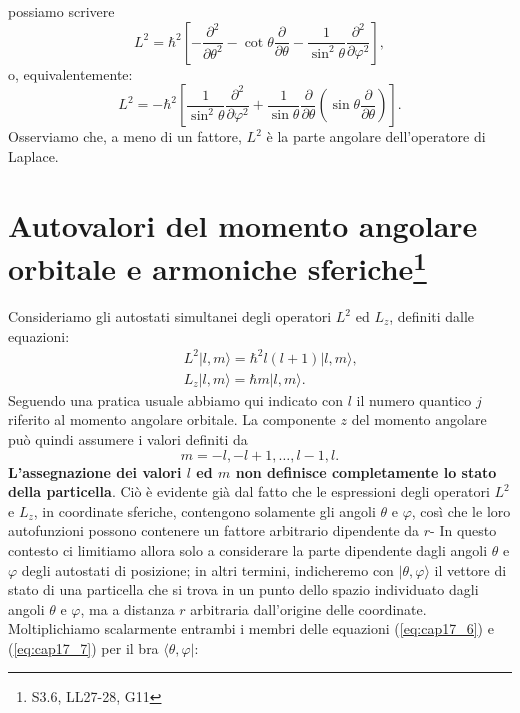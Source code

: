 possiamo scrivere
\begin{equation}
L^2 = \hbar ^2 \left[- \frac{\partial ^2}{\partial \theta ^2}-\cot \theta \frac{\partial}{\partial \theta}- \frac{1}{\sin ^2 \theta}\frac{\partial ^2}{\partial \varphi ^2}\right] ,
\end{equation}
o, equivalentemente:
\begin{equation}
L^2 = -\hbar ^2 \left[\frac{1}{\sin ^2 \theta}\frac{\partial ^2}{\partial \varphi ^2}+\frac{1}{\sin \theta}\frac{\partial}{\partial \theta} \left(\sin \theta \frac{\partial}{\partial \theta}\right)\right] .
\end{equation}
Osserviamo che, a meno di un fattore, $L^2$ è la parte angolare dell'operatore di Laplace.
\section[Autovalori del momento angolare orbitale e armoniche sferiche]{Autovalori del momento angolare orbitale e armoniche sferiche\footnote{S3.6, LL27-28, G11}}
Consideriamo gli autostati simultanei degli operatori $L^2$ ed $L_z$, definiti dalle equazioni:
\begin{eqnarray}
& &L^2 \vert l, m \rangle = \hbar ^2 l(l+1) \vert l, m \rangle ,\label{eq:cap17_6}\\
& &L_z \vert l, m \rangle = \hbar m \vert l, m \rangle \label{eq:cap17_7}.
\end{eqnarray}
Seguendo una pratica usuale abbiamo qui indicato con $l$ il numero quantico $j$ riferito al momento angolare orbitale. La componente $z$ del momento angolare può quindi assumere i valori definiti da
\begin{equation}
m = -l, -l+1, \dots,l-1, l .
\end{equation}
\textbf{L'assegnazione dei valori $l$ ed $m$ non definisce completamente lo stato della particella}. Ciò è evidente già dal fatto che le espressioni degli operatori $L^2$ e $L_z$, in coordinate sferiche, contengono solamente gli angoli $\theta$ e $\varphi$, così che le loro autofunzioni possono contenere un fattore arbitrario dipendente da $r$- In questo contesto ci limitiamo allora solo a considerare la parte dipendente dagli angoli $\theta$ e $\varphi$ degli autostati di posizione; in altri termini, indicheremo con $\vert \theta ,\varphi\rangle$ il vettore di stato di una particella che si trova in un punto dello spazio individuato dagli angoli $\theta $ e $\varphi$, ma a distanza $r$ arbitraria dall'origine delle coordinate.\\
Moltiplichiamo scalarmente entrambi i membri delle equazioni (\ref{eq:cap17_6}) e (\ref{eq:cap17_7}) per il bra $\langle \theta , \varphi \vert$:
